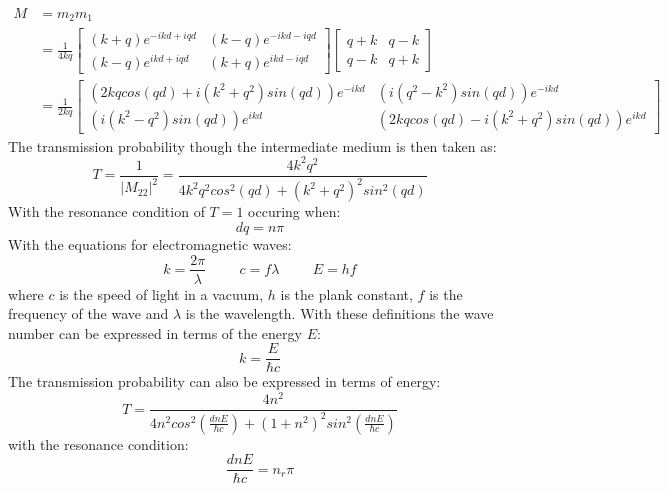 \documentclass[12pt,a4paper]{article}
\begin{document}
		\begin{align}
			M&=m_{2}m_{1}
			\\&=\frac{1}{4kq}
			\left[\begin{array}{ccc}
				\left(k+q\right)e^{-ikd+iqd}&\left(k-q\right)e^{-ikd-iqd}\\
				\left(k-q\right)e^{ikd+iqd}&\left(k+q\right)e^{ikd-iqd}
			\end{array}\right]
			\left[\begin{array}{ccc}
				q+k&q-k\\
				q-k&q+k
			\end{array}\right]
			\\&=\frac{1}{2kq}
			\left[\begin{array}{ccc}
				\left(2kqcos\left(qd\right)+i\left(k^{2}+q^{2}\right)sin\left(qd\right)\right)e^{-ikd}&\left(i\left(q^{2}-k^{2}\right)sin\left(qd\right)\right)e^{-ikd}\\
				\left(i\left(k^{2}-q^{2}\right)sin\left(qd\right)\right)e^{ikd}&\left(2kqcos\left(qd\right)-i\left(k^{2}+q^{2}\right)sin\left(qd\right)\right)e^{ikd}
			\end{array}\right]
		\end{align}
		The transmission probability though the intermediate medium is then taken as:
		\begin{equation}
			T=\frac{1}{|M_{22}|^{2}}
			=\frac{4k^{2}q^{2}}{4k^{2}q^{2}cos^{2}\left(qd\right)+\left(k^{2}+q^{2}\right)^{2}sin^{2}\left(qd\right)}
		\end{equation}
		With the resonance condition of $T=1$ occuring when:
		\begin{equation}
			dq=n\pi
		\end{equation}
		With the equations for electromagnetic waves:
		\begin{equation}
			k=\frac{2\pi}{\lambda}
			\hspace{1cm}
			c=f\lambda
			\hspace{1cm}
			E=hf
		\end{equation}
		where $c$ is the speed of light in a vacuum, $h$ is the plank constant, $f$ is the frequency of the wave and $\lambda$ is the wavelength. With these definitions the wave number can be expressed in terms of the energy $E$:
		\begin{equation}
			k=\frac{E}{\hbar c}
		\end{equation}
		The transmission probability can also be expressed in terms of energy:
		\begin{equation}
			T=\frac{4n^{2}}{4n^{2}cos^{2}\left(\frac{dnE}{\hbar c}\right)+\left(1+n^{2}\right)^{2}sin^{2}\left(\frac{dnE}{\hbar c}\right)}
		\end{equation}
		with the resonance condition:
		\begin{equation}
			\frac{dnE}{\hbar c}=n_{r}\pi
		\end{equation}
\end{document}
